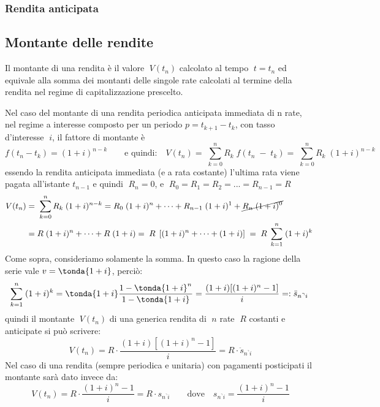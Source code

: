 \subsubsection{Rendita anticipata}

\subsection{Montante delle rendite}
Il montante di una rendita è il valore \(\;V(t_n)\) calcolato al tempo \(\;t=t_n\) 
ed equivale alla somma dei montanti delle singole rate calcolati al termine 
della rendita nel regime di capitalizzazione prescelto.


Nel caso del montante di una rendita periodica anticipata immediata di n rate, 
nel regime a interesse composto per un periodo 
\(p= t_{k+1}-t_k\), con tasso d'interesse \(\;i\), il fattore di montante è
\[f(t_n-t_k)=(1+i)^{n-k} \qquad \text{e quindi:} \quad V(t_n)=\; \sum^{n}_{k=0}R_k\; f(t_n\;-\;t_k)= \; \sum^{n}_{k=0}R_k\; 
(1+i)^{n-k}\]
essendo la rendita anticipata immediata (e a rata costante) l'ultima rata viene 
pagata all'istante \(t_{n-1}\) e quindi \(\;R_n=0\), e 
\(\;R_{0}=R_{1}=R_{2}=...=R_{n-1}=R\)
\[\begin{aligned}
   V(t_n)&=\; \sum^{n}_{k=0}R_k\; 
(1+i)^{n-k}= R_0\; 
(1+i)^{n}+\dots+R_{n-1}\; 
(1+i)^{1}+\cancel{R_n\; 
(1+i)^{0}}\\
&=R\; 
(1+i)^{n}+\dots + R\; 
(1+i)= \;R \;\left[(1+i)^n+\dots+(1+i)\right]\;=\;R\; 
\sum^{n}_{k=1}\; (1+i)^{k}
  \end{aligned}
\]
Come sopra, consideriamo solamente la somma. In questo caso la ragione
della serie vale \(v = \tonda{1+i}\), perciò:
\[\sum^{n}_{k=1}\; (1+i)^{k} =\tonda{1+i} \frac{1-\tonda{1+i}^n}{1-\tonda{1+i}}=
\frac{(1+i)[(1+i)^{n}-1]}{i}=:\ddot{s}_{n^\urcorner i}\]
quindi il montante \(\; V(t_n)\) di una generica rendita di \(\;n\) rate \(\;R\) 
costanti e anticipate si può scrivere:
\[\; V(t_n) = R\cdot\frac{(1+i)[(1+i)^{n}-1]}{i} = R\cdot\ddot{s}_{n^\urcorner 
i}\]
Nel caso di una rendita (sempre periodica e unitaria) con pagamenti posticipati il montante sarà dato invece da:
\[\; V(t_n)= R\cdot\frac{(1+i)^{n}-1}{i}= R\cdot s_{n^\urcorner i} \qquad \text{dove} \quad
s_{n^\urcorner i} = \frac{(1+i)^{n}-1}{i}\]



